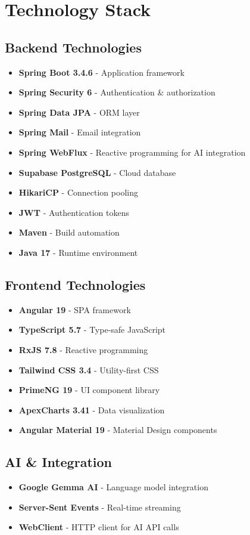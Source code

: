 \documentclass[11pt,a4paper]{article}
\begin{document}
\section{Technology Stack}

\subsection{Backend Technologies}
\begin{itemize}[leftmargin=*]
    \item \textbf{Spring Boot 3.4.6} - Application framework
    \item \textbf{Spring Security 6} - Authentication \& authorization
    \item \textbf{Spring Data JPA} - ORM layer
    \item \textbf{Spring Mail} - Email integration
    \item \textbf{Spring WebFlux} - Reactive programming for AI integration
    \item \textbf{Supabase PostgreSQL} - Cloud database
    \item \textbf{HikariCP} - Connection pooling
    \item \textbf{JWT} - Authentication tokens
    \item \textbf{Maven} - Build automation
    \item \textbf{Java 17} - Runtime environment
\end{itemize}

\subsection{Frontend Technologies}
\begin{itemize}[leftmargin=*]
    \item \textbf{Angular 19} - SPA framework
    \item \textbf{TypeScript 5.7} - Type-safe JavaScript
    \item \textbf{RxJS 7.8} - Reactive programming
    \item \textbf{Tailwind CSS 3.4} - Utility-first CSS
    \item \textbf{PrimeNG 19} - UI component library
    \item \textbf{ApexCharts 3.41} - Data visualization
    \item \textbf{Angular Material 19} - Material Design components
\end{itemize}

\subsection{AI \& Integration}
\begin{itemize}[leftmargin=*]
    \item \textbf{Google Gemma AI} - Language model integration
    \item \textbf{Server-Sent Events} - Real-time streaming
    \item \textbf{WebClient} - HTTP client for AI API calls
\end{itemize}
\end{document}
